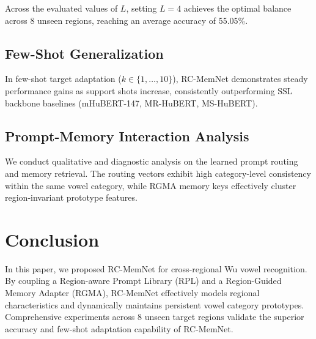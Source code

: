 \documentclass[letterpaper]{article} %
\begin{document}
Across the evaluated values of $L$, setting $L=4$ achieves the optimal balance across 8 unseen regions, reaching an average accuracy of 55.05\%.

\subsection{Few-Shot Generalization}
In few-shot target adaptation ($k \in \{1, \dots, 10\}$), RC-MemNet demonstrates steady performance gains as support shots increase, consistently outperforming SSL backbone baselines (mHuBERT-147, MR-HuBERT, MS-HuBERT).

\subsection{Prompt-Memory Interaction Analysis}
We conduct qualitative and diagnostic analysis on the learned prompt routing and memory retrieval. The routing vectors exhibit high category-level consistency within the same vowel category, while RGMA memory keys effectively cluster region-invariant prototype features.

\section{Conclusion}
In this paper, we proposed RC-MemNet for cross-regional Wu vowel recognition. By coupling a Region-aware Prompt Library (RPL) and a Region-Guided Memory Adapter (RGMA), RC-MemNet effectively models regional characteristics and dynamically maintains persistent vowel category prototypes. Comprehensive experiments across 8 unseen target regions validate the superior accuracy and few-shot adaptation capability of RC-MemNet.


\end{document}
